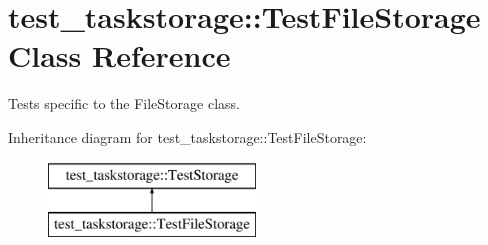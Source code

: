 \hypertarget{classtest__taskstorage_1_1TestFileStorage}{
\section{test\-\_\-taskstorage\-:\-:\-Test\-File\-Storage \-Class \-Reference}
\label{classtest__taskstorage_1_1TestFileStorage}
}


\-Tests specific to the \-File\-Storage class.  


\-Inheritance diagram for test\-\_\-taskstorage\-:\-:\-Test\-File\-Storage\-:\begin{figure}[H]
\begin{center}
\leavevmode
\includegraphics[height=2.000000cm]{classtest__taskstorage_1_1TestFileStorage}
\end{center}
\end{figure}
